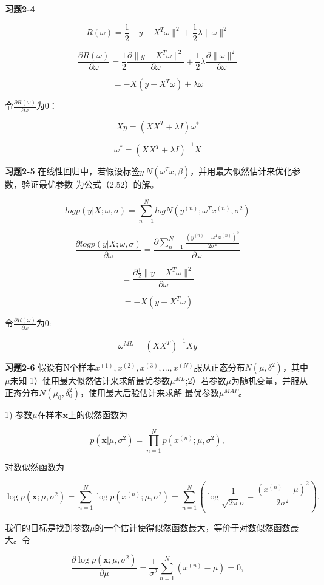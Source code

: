 \noindent\textbf{习题2-4}

\[R(\omega) = \frac{1}{2}\|y - X^T\omega\|^2 + \frac{1}{2}\lambda\|\omega\|^2\]

\[\frac{\partial R(\omega)}{\partial \omega} = \frac{1}{2}\frac{\partial \|y - X^T\omega\|^2}{\partial \omega} + \frac{1}{2}\lambda\frac{\partial \|\omega\|^2}{\partial \omega}\]

\[= -X(y - X^T\omega) + \lambda\omega\]

令$\frac{\partial R(\omega)}{\partial \omega}$为0：

\[Xy = (XX^T + \lambda I)\omega^*\]

\[\omega^* = (XX^T + \lambda I)^{-1}X\]

\noindent\textbf{习题2-5} 在线性回归中，若假设标签$y~N(\omega^Tx,\beta)$，并用最大似然估计来优化参数，验证最优参数
为公式（2.52）的解。

\[log p(y|X; \omega, \sigma) = \sum_{n=1}^N logN(y^{(n)}; \omega^T x^{(n)}, \sigma^2)\]

\[\frac{\partial log p(y|X; \omega, \sigma)}{\partial \omega} = \frac{\partial \sum_{n=1}^N \frac{(y^{(n)} - \omega^T x^{(n)})^2}{2\sigma^2}}{\partial \omega}\]

\[= \frac{\partial \frac{1}{2} \|y - X^T\omega\|^2}{\partial \omega}\]

\[= -X(y - X^T\omega)\]

令$\frac{\partial R(\omega)}{\partial \omega}$为0:

\[\omega^{ML} = (XX^T)^{-1}Xy\]

\noindent\textbf{习题2-6} 假设有N个样本$x^{(1)},x^{(2)},x^{(3)},...,x^{(N)}$服从正态分布$N(\mu,\delta^2)$，其中$\mu$未知
1）使用最大似然估计来求解最优参数$\mu^{ML}$;2）若参数$\mu$为随机变量，并服从正态分布$N(\mu_0,\delta^2_0)$，使用最大后验估计来求解
最优参数$\mu^{MAP}$。

1) 参数$\mu$在样本$\mathbf{x}$上的似然函数为

\[p(\mathbf{x}|\mu,\sigma^2)=\prod_{n=1}^N p(x^{(n)};\mu,\sigma^2),\]

对数似然函数为

\[\log p(\mathbf{x};\mu,\sigma^2)=\sum_{n=1}^N \log p(x^{(n)};\mu,\sigma^2)=\sum_{n=1}^N \left(\log\frac{1}{\sqrt{2\pi}\sigma}-\frac{(x^{(n)}-\mu)^2}{2\sigma^2}\right).\]

我们的目标是找到参数$\mu$的一个估计使得似然函数最大，等价于对数似然函数最大。令

\[\frac{\partial \log p(\mathbf{x};\mu,\sigma^2)}{\partial \mu}=\frac{1}{\sigma^2}\sum_{n=1}^N(x^{(n)}-\mu)=0,\]

